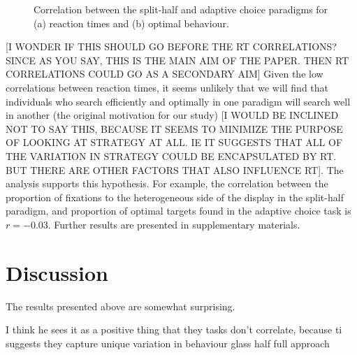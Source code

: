 \documentclass[]{rsos}%
\begin{document}
\begin{figure}
\centering
{}
\caption{Correlation between the split-half and adaptive choice paradigms for (a) reaction times and (b) optimal behaviour.}
\label{fig:between_para_rt}
\end{figure}

[I WONDER IF THIS SHOULD GO BEFORE THE RT CORRELATIONS? SINCE AS YOU SAY, THIS IS THE MAIN AIM OF THE PAPER. THEN RT CORRELATIONS COULD GO AS A SECONDARY AIM] Given the low correlations between reaction times, it seems unlikely that we will find that individuals who search efficiently and optimally in one paradigm will search well in another (the original motivation for our study) [I WOULD BE INCLINED NOT TO SAY THIS, BECAUSE IT SEEMS TO MINIMIZE THE PURPOSE OF LOOKING AT STRATEGY AT ALL. IE IT SUGGESTS THAT ALL OF THE VARIATION IN STRATEGY COULD BE ENCAPSULATED BY RT. BUT THERE ARE OTHER FACTORS THAT ALSO INFLUENCE RT]. The analysis supports this hypothesis. For example, the correlation between the proportion of fixations to the heterogeneous side of the display in the split-half paradigm, and proportion of optimal targets found in the adaptive choice task is $r=-0.03$. Further results are presented in supplementary materials. 

\section{Discussion}

The results presented above are somewhat surprising. 


I think he sees it as a positive thing that they tasks don't correlate, because ti suggests they capture unique variation in behaviour
glass half full approach 
\end{document}
